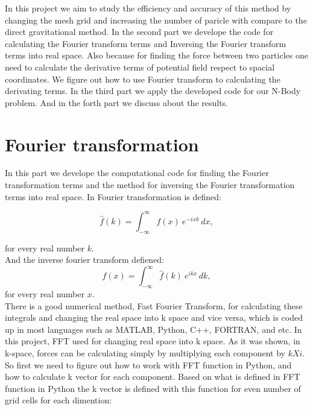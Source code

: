 \documentclass[10pt]{article}
\begin{document}
In this project we aim to study the efficiency and accuracy of this method by changing the mesh grid and increasing the number of paricle with compare to the direct gravitational method. In the second part we develope the code for calculating the Fourier transform terms and Inversing the Fourier transform terms into real space. Also because for finding the force between two particles one need to calculate the derivative terms of potential field respect to spacial coordinates. We figure out how to use Fourier transform to calculating the derivating terms. In the third part we apply the developed code for our N-Body problem. And in the forth part we discuss about the results.\\

\section{Fourier transformation}

In this part we develope the computational code for finding the Fourier transformation terms and the method for inversing the Fourier transformation terms into real space. In Fourier transformation is defined:

\begin{equation}
    \hat{f}(k) = \int_{-\infty}^{\infty} f(x)\ e^{- i x k}\,dx,
\end{equation}

for every real number $k$.\\
And the inverse fourier transform defiened:
\begin{equation}
    f(x) = \int_{-\infty}^{\infty} \hat{f}(k)\ e^{ i k x}\,dk,  
\end{equation}
for every real number $x$.\\

There is a good numerical method, Fast Fourier Transform, for calculating these integrals and changing the real space into k space and vice versa, which is coded up in most languages such as MATLAB, Python, C++, FORTRAN, and etc. In this project, FFT used for changing real space into k space. As it was shown, in k-space, forces can be calculating simply by multiplying each component by $k X i$. \\

So first we need to figure out how to work with FFT function in Python, and how to calculate k vector for each component. Based on what is defined in FFT function in Python the k vector is defined with this function for even number of grid cells for each dimention: \\
\end{document}
